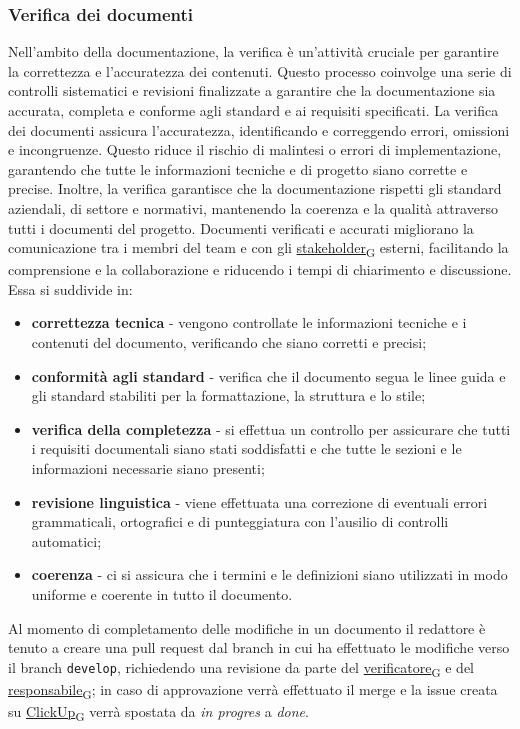 \subsubsection{Verifica dei documenti} \label{verifica_dei_documenti}
Nell'ambito della documentazione, la verifica è un'attività cruciale per garantire la correttezza e l'accuratezza dei contenuti. Questo processo coinvolge una serie di controlli sistematici e revisioni finalizzate a garantire che la documentazione sia accurata, completa e conforme agli standard e ai requisiti specificati.
La verifica dei documenti assicura l'accuratezza, identificando e correggendo errori, omissioni e incongruenze. Questo riduce il rischio di malintesi o errori di implementazione, garantendo che tutte le informazioni tecniche e di progetto siano corrette e precise.
Inoltre, la verifica garantisce che la documentazione rispetti gli standard aziendali, di settore e normativi, mantenendo la coerenza e la qualità attraverso tutti i documenti del progetto. Documenti verificati e accurati migliorano la comunicazione tra i membri del team e con gli \href{https://7last.github.io/docs/rtb/documentazione-interna/glossario\#stakeholder}{stakeholder\textsubscript{G}} esterni, facilitando la comprensione e la collaborazione e riducendo i tempi di chiarimento e discussione.
\newpage
Essa si suddivide in:
\begin{itemize}
	\item \textbf{correttezza tecnica} - vengono controllate le informazioni tecniche e i contenuti del documento, verificando che siano corretti e precisi;
	\item \textbf{conformità agli standard} - verifica che il documento segua le linee guida e gli standard stabiliti per la formattazione, la struttura e lo stile;
	\item \textbf{verifica della completezza} - si effettua un controllo per assicurare che tutti i requisiti documentali siano stati soddisfatti e che  tutte le sezioni e le informazioni necessarie siano presenti;
	\item \textbf{revisione linguistica} - viene effettuata una correzione di eventuali errori grammaticali, ortografici e di punteggiatura con l'ausilio di controlli automatici;
	\item \textbf{coerenza} - ci si assicura che i termini e le definizioni siano utilizzati in modo uniforme e coerente in tutto il documento.
\end{itemize}

Al momento di completamento delle modifiche in un documento il redattore è tenuto a creare una pull request dal branch in cui ha effettuato le modifiche verso il branch \texttt{develop}, richiedendo una revisione da parte del \href{https://7last.github.io/docs/rtb/documentazione-interna/glossario\#verificatore}{verificatore\textsubscript{G}} e del \href{https://7last.github.io/docs/rtb/documentazione-interna/glossario\#responsabile}{responsabile\textsubscript{G}}; in caso di approvazione verrà effettuato il merge e la issue creata su \href{https://7last.github.io/docs/rtb/documentazione-interna/glossario\#clickup}{ClickUp\textsubscript{G}} verrà spostata da \textit{in progres} a \textit{done}.

